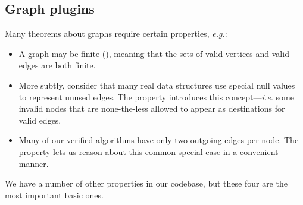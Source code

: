 \subsection{Graph plugins}

Many theorems about graphs require certain properties, \emph{e.g.}:
\begin{itemize}
\item A graph may be finite (), meaning that the sets of valid vertices and valid edges are both finite.
\iffalse
\item A \emph{locally finite} graph (\p{LocalFiniteGraph}) is less restrictive, requiring only that each vertex have a finite number of neighbors.  Locally finite graphs are useful when we wish to reason about algorithms that process vertices by cycling through neighbors, such as breadth-first search.
\fi
\item More subtly, consider that many real data structures use special null values to represent unused edges.  The  property introduces this concept---\emph{i.e.} some invalid nodes that are none-the-less allowed to appear as destinations for valid edges.
\item Many of our verified algorithms have only two outgoing edges per node.  The  property lets us reason about this common special case in a convenient manner.
\end{itemize}
We have a number of other properties in our codebase, but these four are the most important basic ones.


